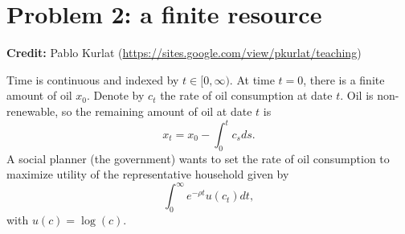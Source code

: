 \documentclass[11pt]{extarticle}
\theoremstyle{plain}
\theoremstyle{definition}
\begin{document}
\vspace{10mm}
\section*{Problem 2: a finite resource}

\textbf{Credit:} Pablo Kurlat (\url{https://sites.google.com/view/pkurlat/teaching})


\vspace{5mm}
\noindent
Time is continuous and indexed by $t \in [0, \infty)$. At time $t=0$, there is a finite amount of oil $x_0$. Denote by $c_t$ the rate of oil consumption at date $t$. Oil is non-renewable, so the remaining amount of oil at date $t$ is 
\begin{equation*}
	x_t = x_0 - \int_0^t c_s ds.
\end{equation*}
A social planner (the government) wants to set the rate of oil consumption to maximize utility of the representative household given by
\begin{equation*}
	\int_0^\infty e^{- \rho t} u(c_t) dt,
\end{equation*}
with $u(c) = \log(c)$. 
\end{document}
